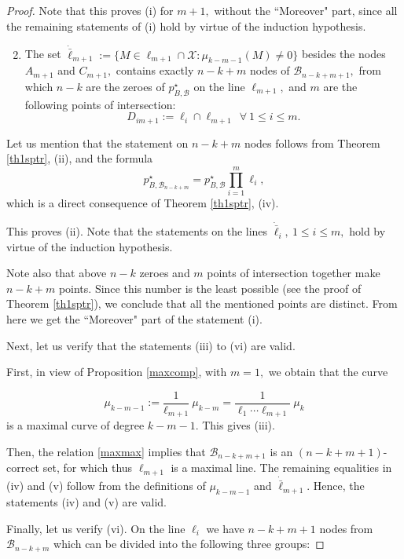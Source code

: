 \documentclass[10pt,a4paper]{amsart}
\newcommand{\Bset}{\mathcal{B}}
\newcommand{\Xset}{\mathcal{X}}
\begin{document}
\begin{proof}
Note that this proves (i) for $m+1,$ without the ``Moreover" part, since all the remaining statements of (i) hold by virtue of the induction hypothesis.
\begin{enumerate}[label*=\arabic*.]
\setcounter{enumi}{1}
\setlength{\itemsep}{0mm}
\item
The set $\dot{\bar\ell}_{m+1}:=\{M\in \ell_{m+1}\cap  \Xset: \mu_{k-m-1}(M)
\neq 0\}$ 
besides the nodes $A_{m+1}$ and $C_{m+1},$ contains exactly $n-k+m$ nodes of $\Bset_{n-k+m+1},$ from which $n-k$ are the zeroes of $p^\star_{B,\Bset}$ on the line $\ell_{m+1},$  and $m$ are the following points of intersection: 
$$D_{im+1}:=\ell_i\cap\ell_{m+1}\ \ \forall\ 1\le i \le m.$$ 
\end{enumerate}
Let us mention that the statement on $n-k+m$ nodes follows from Theorem \ref{th1sptr}, (ii), and  the formula
\begin{equation*}p^\star_{B,\Bset_{n-k+m}}=p^\star_{B,\Bset}\prod_{i=1}^m\ell_i,
\end{equation*}
 which is a direct consequence of Theorem \ref{th1sptr}, (iv).

\noindent This proves (ii). Note that the statements on the lines $\dot{\bar\ell}_i,\ 1\le i\le m,$ hold by virtue of the induction hypothesis.

Note also that above $n-k$ zeroes and $m$ points of intersection together make 
$n-k+m$ points. Since this number is the least possible (see the proof of Theorem \ref{th1sptr}), we conclude that all the mentioned
points are distinct. From here we get the ``Moreover" part of the statement (i).  

Next, let us verify that the statements (iii) to (vi) are valid.

First, in view of Proposition \ref{maxcomp}, with $m=1,$ we obtain that the curve 

$$\mu_{k-m-1}:=\frac{1}{\ell_{m+1}}\ \mu_{k-m}=\frac{1}{\ell_1\cdots\ell_{m+1}}\ \mu_{k}$$ is a maximal curve of degree $k-m-1.$ This gives (iii).
 

 Then, the relation \eqref{maxmax} implies that $\Bset_{n-k+m+1}$ is an  $(n-k+m+1)$-correct set, for which thus $\ell_{m+1}$ is a maximal line. The remaining equalities in (iv) and (v) follow from the definitions of $\mu_{k-m-1}$ and ${\dot{\bar{\ell}}}_{m+1}.$  Hence, the statements (iv) and (v) are valid. 

Finally, let us verify (vi). On the line $\ell_{i}$ we have $n-k+m+1$ nodes from $\Bset_{n-k+m}$ which can be divided into the following three groups:


\end{proof}
\end{document}
